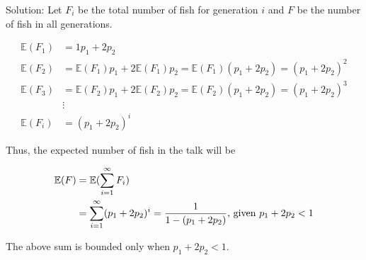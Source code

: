 \documentclass[10pt]{537homework}
\begin{document}
Solution: Let $F_i$ be the total number of fish for generation $i$ and $F$ be the number of fish in all generations. 

\begin{align*}
  \mathbb{E}(F_1)     & = 1p_1 + 2p_2 \\
  \mathbb{E}(F_2)     & = \mathbb{E}(F_1)p_1 + 2\mathbb{E}(F_1)p_2 = \mathbb{E}(F_1)(p_1 + 2p_2) = (p_1 + 2p_2)^2\\
  \mathbb{E}(F_3)     & = \mathbb{E}(F_2)p_1 + 2\mathbb{E}(F_2)p_2 = \mathbb{E}(F_2)(p_1 + 2p_2) = (p_1 + 2p_2)^3 \\
  & \vdots \\
  \mathbb{E}(F_i) & = (p_1 + 2p_2)^i
\end{align*}

Thus, the expected number of fish in the talk will be 

\begin{align*}
  \mathbb{E}(F)   & = \mathbb{E}(\sum_{i=1}^{\infty} F_i) \\
                  & = \sum_{i=1}^{\infty} (p_1 + 2p_2)^i = {1 \over 1 - (p_1 + 2p_2)} \text{, given $p_1 + 2p_2 < 1$}
\end{align*}

The above sum is bounded only when $p_1 + 2p_2 < 1$.
\end{document}
